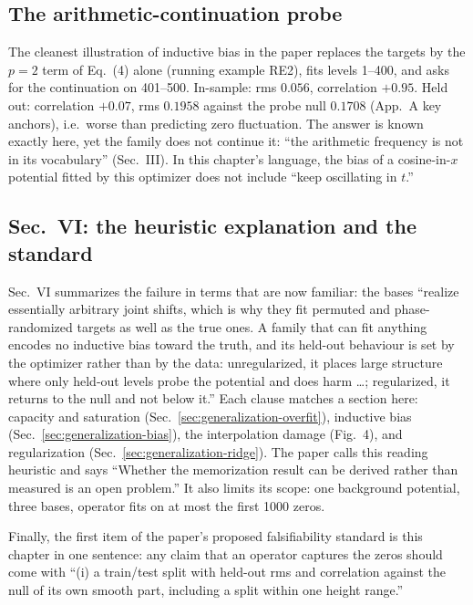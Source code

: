 \subsection{The arithmetic-continuation probe}

The cleanest illustration of inductive bias in the paper replaces the targets by the $p=2$ term of Eq.~(4) alone (running example RE2), fits levels 1--400, and asks for the continuation on 401--500. In-sample: rms $0.056$, correlation $+0.95$. Held out: correlation $+0.07$, rms $0.1958$ against the probe null $0.1708$ (App.~A key anchors), i.e.\ worse than predicting zero fluctuation. The answer is known exactly here, yet the family does not continue it: ``the arithmetic frequency is not in its vocabulary'' (Sec.~III). In this chapter's language, the bias of a cosine-in-$x$ potential fitted by this optimizer does not include ``keep oscillating in $t$.''

\subsection{Sec.~VI: the heuristic explanation and the standard}

Sec.~VI summarizes the failure in terms that are now familiar: the bases ``realize essentially arbitrary joint shifts, which is why they fit permuted and phase-randomized targets as well as the true ones. A family that can fit anything encodes no inductive bias toward the truth, and its held-out behaviour is set by the optimizer rather than by the data: unregularized, it places large structure where only held-out levels probe the potential and does harm \ldots; regularized, it returns to the null and not below it.'' Each clause matches a section here: capacity and saturation (Sec.~\ref{sec:generalization-overfit}), inductive bias (Sec.~\ref{sec:generalization-bias}), the interpolation damage (Fig.~4), and regularization (Sec.~\ref{sec:generalization-ridge}). The paper calls this reading heuristic and says ``Whether the memorization result can be derived rather than measured is an open problem.'' It also limits its scope: one background potential, three bases, operator fits on at most the first 1000 zeros.

Finally, the first item of the paper's proposed falsifiability standard is this chapter in one sentence: any claim that an operator captures the zeros should come with ``(i) a train/test split with held-out rms and correlation against the null of its own smooth part, including a split within one height range.''

